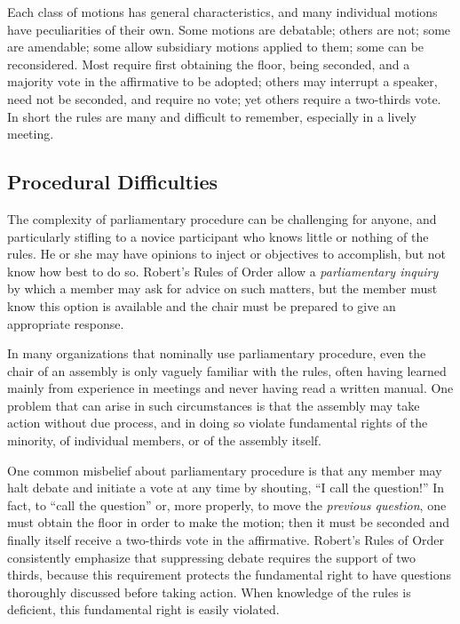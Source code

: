 \documentclass{acm_proc_article-sp}
\begin{document}
Each class of motions has general characteristics, and many individual motions have peculiarities of their own. Some motions are debatable; others are not; some are amendable; some allow subsidiary motions applied to them; some can be reconsidered. Most require first obtaining the floor, being seconded, and a majority vote in the affirmative to be adopted; others may interrupt a speaker, need not be seconded, and require no vote; yet others require a two-thirds vote. In short the rules are many and difficult to remember, especially in a lively meeting.

\subsection{Procedural Difficulties}


The complexity of parliamentary procedure can be challenging for anyone, and particularly stifling to a novice participant who knows little or nothing of the rules. He or she may have opinions to inject or objectives to accomplish, but not know how best to do so. Robert's Rules of Order allow a \emph{parliamentary inquiry} by which a member may ask for advice on such matters, but the member must know this option is available and the chair must be prepared to give an appropriate response.


In many organizations that nominally use parliamentary procedure, even the chair of an assembly is only vaguely familiar with the rules, often having learned mainly from experience in meetings and never having read a written manual. One problem that can arise in such circumstances is that the assembly may take action without due process, and in doing so violate fundamental rights of the minority, of individual members, or of the assembly itself.

One common misbelief about parliamentary procedure is that any member may halt debate and initiate a vote at any time by shouting, ``I call the question!'' In fact, to ``call the question'' or, more properly, to move the \emph{previous question}, one must obtain the floor in order to make the motion; then it must be seconded and finally itself receive a two-thirds vote in the affirmative. Robert's Rules of Order consistently emphasize that suppressing debate requires the support of two thirds, because this requirement protects the fundamental right to have questions thoroughly discussed before taking action. When knowledge of the rules is deficient, this fundamental right is easily violated.
\end{document}
